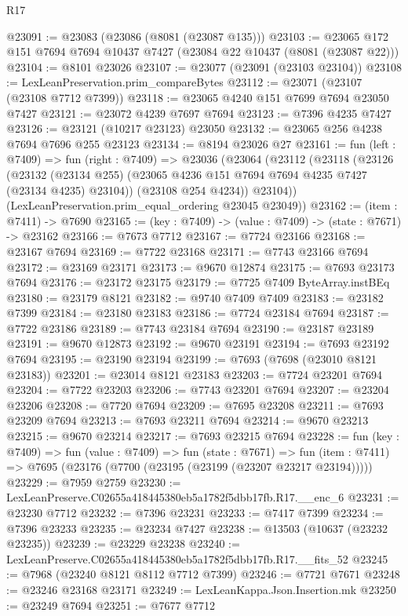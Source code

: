 \begin{lexlean}{R17}
\begin{coremodule}
@23091 := @23083 (@23086 (@8081 (@23087 @135)))
@23103 := @23065 @172 @151 @7694 @7694 @10437 @7427 (@23084 @22 @10437 (@8081 (@23087 @22)))
@23104 := @8101 @23026
@23107 := @23077 (@23091 (@23103 @23104))
@23108 := LexLeanPreservation.prim_compareBytes
@23112 := @23071 (@23107 (@23108 @7712 @7399))
@23118 := @23065 @4240 @151 @7699 @7694 @23050 @7427
@23121 := @23072 @4239 @7697 @7694
@23123 := @7396 @4235 @7427
@23126 := @23121 (@10217 @23123) @23050
@23132 := @23065 @256 @4238 @7694 @7696 @255 @23123
@23134 := @8194 @23026 @27
@23161 := fun (left : @7409) =>
  fun (right : @7409) =>
  @23036
    (@23064
      (@23112
        (@23118
          (@23126
            (@23132 (@23134 @255) (@23065 @4236 @151 @7694 @7694 @4235 @7427 (@23134 @4235) @23104))
            (@23108 @254 @4234))
          @23104))
      (LexLeanPreservation.prim_equal_ordering @23045 @23049))
@23162 := (item : @7411) -> @7690
@23165 := (key : @7409) -> (value : @7409) -> (state : @7671) -> @23162
@23166 := @7673 @7712
@23167 := @7724 @23166
@23168 := @23167 @7694
@23169 := @7722 @23168
@23171 := @7743 @23166 @7694
@23172 := @23169 @23171
@23173 := @9670 @12874
@23175 := @7693 @23173 @7694
@23176 := @23172 @23175
@23179 := @7725 @7409 ByteArray.instBEq
@23180 := @23179 @8121
@23182 := @9740 @7409 @7409
@23183 := @23182 @7399
@23184 := @23180 @23183
@23186 := @7724 @23184 @7694
@23187 := @7722 @23186
@23189 := @7743 @23184 @7694
@23190 := @23187 @23189
@23191 := @9670 @12873
@23192 := @9670 @23191
@23194 := @7693 @23192 @7694
@23195 := @23190 @23194
@23199 := @7693 (@7698 (@23010 @8121 @23183))
@23201 := @23014 @8121 @23183
@23203 := @7724 @23201 @7694
@23204 := @7722 @23203
@23206 := @7743 @23201 @7694
@23207 := @23204 @23206
@23208 := @7720 @7694
@23209 := @7695 @23208
@23211 := @7693 @23209 @7694
@23213 := @7693 @23211 @7694
@23214 := @9670 @23213
@23215 := @9670 @23214
@23217 := @7693 @23215 @7694
@23228 := fun (key : @7409) =>
  fun (value : @7409) =>
  fun (state : @7671) =>
  fun (item : @7411) => @7695 (@23176 (@7700 (@23195 (@23199 (@23207 @23217 @23194)))))
@23229 := @7959 @2759
@23230 := LexLeanPreserve.C02655a418445380eb5a1782f5dbb17fb.R17.__enc_6
@23231 := @23230 @7712
@23232 := @7396 @23231
@23233 := @7417 @7399
@23234 := @7396 @23233
@23235 := @23234 @7427
@23238 := @13503 (@10637 (@23232 @23235))
@23239 := @23229 @23238
@23240 := LexLeanPreserve.C02655a418445380eb5a1782f5dbb17fb.R17.__fits_52
@23245 := @7968 (@23240 @8121 @8112 @7712 @7399)
@23246 := @7721 @7671
@23248 := @23246 @23168 @23171
@23249 := LexLeanKappa.Json.Insertion.mk
@23250 := @23249 @7694
@23251 := @7677 @7712

\end{coremodule}
\end{lexlean}
